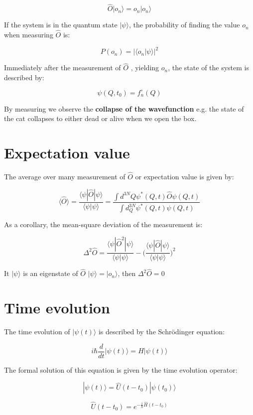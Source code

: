 $$\hat{O}|o_n\rangle = o_n|o_n\rangle$$

If the system is in the quantum state $|\psi\rangle$, the probability of finding the value $o_n$ when measuring $\hat{O}$ is:

$$P(o_n) = |\langle o_n|\psi\rangle|^2$$

Immediately after the measurement of $\hat{O}$ , yielding $o_n$, the state of the system is described by:

$$\psi(Q,t_0)=f_n^{\circ}(Q)$$

By measuring we observe the \textbf{collapse of the wavefunction} e.g. the state of the cat collapses to either dead or alive when we open the box.

\section{Expectation value}
The average over many measurement of $\hat{O}$ or expectation value is given by:

$$\langle \hat{O}\rangle = \frac{\langle\psi|\hat{O}|\psi\rangle}{\langle \psi|\psi\rangle}=\frac{\int d^{3 N} Q \psi^{*}(Q, t) \hat{O} \psi(Q, t)}{\int d_{Q}^{3 N} \psi^{*}(Q, t) \psi(Q, t)}$$

As a corollary,  the mean-square deviation of the measurement is:

$$\Delta^2\hat{O} = \frac{\langle \psi|\hat{O}^2|\psi\rangle}{\langle\psi|\psi\rangle}-\biggl(\frac{\langle\psi|\hat{O}|\psi\rangle}{\langle\psi|\psi\rangle}\biggr)^2$$

It $|\psi\rangle$ is an eigenstate of $\hat{O}$ $|\psi\rangle = |o_n\rangle$, then $\Delta^2\hat{O} = 0$

\section{Time evolution}
The time evolution of $|\psi(t)\rangle$ is described by the Schr\"odinger equation:

$$i\hbar \frac{d{}}{d{t}}|\psi(t)\rangle = H|\psi(t)\rangle$$

The formal solution of this equation is given by the time evolution operator:

$$|\psi(t)\rangle = \hat{U}(t-t_0)|\psi(t_0)\rangle$$

$$\hat{U}(t-t_0) = e^{-\frac{i}{\hbar}\hat{H}(t-t_0)}$$

